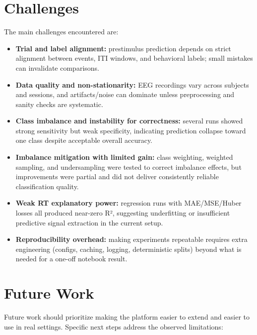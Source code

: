 \section{Challenges}
The main challenges encountered are:
\begin{itemize}
    \item \textbf{Trial and label alignment:} prestimulus prediction depends on strict alignment between events, ITI windows, and behavioral labels; small mistakes can invalidate comparisons.
    \item \textbf{Data quality and non-stationarity:} EEG recordings vary across subjects and sessions, and artifacts/noise can dominate unless preprocessing and sanity checks are systematic.
    \item \textbf{Class imbalance and instability for correctness:} several runs showed strong sensitivity but weak specificity, indicating prediction collapse toward one class despite acceptable overall accuracy.
    \item \textbf{Imbalance mitigation with limited gain:} class weighting, weighted sampling, and undersampling were tested to correct imbalance effects, but improvements were partial and did not deliver consistently reliable classification quality.
    \item \textbf{Weak RT explanatory power:} regression runs with MAE/MSE/Huber losses all produced near-zero R², suggesting underfitting or insufficient predictive signal extraction in the current setup.
    \item \textbf{Reproducibility overhead:} making experiments repeatable requires extra engineering (configs, caching, logging, deterministic splits) beyond what is needed for a one-off notebook result.
\end{itemize}

\section{Future Work}
Future work should prioritize making the platform easier to extend and easier to use in real settings. Specific next steps address the observed limitations:

